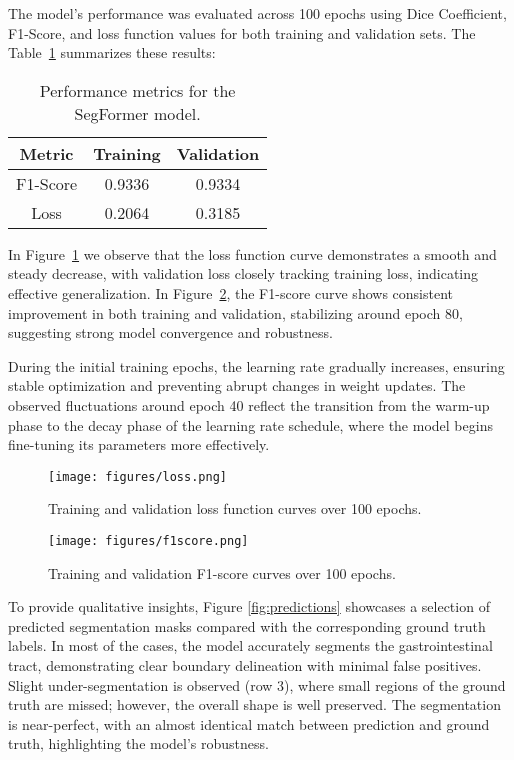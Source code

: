 \documentclass[journal]{IEEEtran}
\begin{document}
The model's performance was evaluated across 100 epochs using Dice Coefficient, F1-Score, and loss function values for both training and validation sets. The Table~\ref{tab:results} summarizes these results:

\begin{table}[h]
\centering
\caption{Performance metrics for the SegFormer model.}
\begin{tabular}{|c|c|c|}
\hline
\textbf{Metric} & \textbf{Training} & \textbf{Validation} \\
\hline
F1-Score & 0.9336 & 0.9334 \\
Loss & 0.2064 & 0.3185 \\
\hline
\end{tabular}
\label{tab:results}
\end{table}

In Figure~\ref{fig:loss_curves} we observe that the loss function curve demonstrates a smooth and steady decrease, with validation loss closely tracking training loss, indicating effective generalization. In Figure~\ref{fig:f1_curves}, the F1-score curve shows consistent improvement in both training and validation, stabilizing around epoch 80, suggesting strong model convergence and robustness. 

During the initial training epochs, the learning rate gradually increases, ensuring stable optimization and preventing abrupt changes in weight updates. The observed fluctuations around epoch 40 reflect the transition from the warm-up phase to the decay phase of the learning rate schedule, where the model begins fine-tuning its parameters more effectively.

\begin{figure}[h]
\centering
\texttt{[image: figures/loss.png]}
\caption{Training and validation loss function curves over 100 epochs.}
\label{fig:loss_curves}
\end{figure}

\begin{figure}[h]
\centering
\texttt{[image: figures/f1score.png]}
\caption{Training and validation F1-score curves over 100 epochs.}
\label{fig:f1_curves}
\end{figure}

To provide qualitative insights, Figure \ref{fig:predictions} showcases a selection of predicted segmentation masks compared with the corresponding ground truth labels. In most of the cases, the model accurately segments the gastrointestinal tract, demonstrating clear boundary delineation with minimal false positives. Slight under-segmentation is observed (row 3), where small regions of the ground truth are missed; however, the overall shape is well preserved. The segmentation is near-perfect, with an almost identical match between prediction and ground truth, highlighting the model's robustness.
\end{document}

